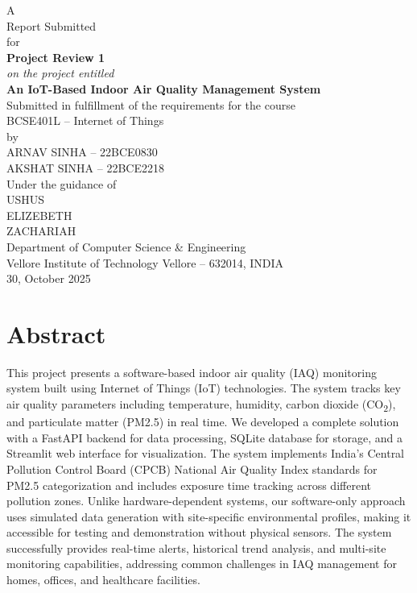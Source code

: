 \documentclass[12pt]{report}
\newcommand{\course}{BCSE401L -- Internet of Things}
\newcommand{\projecttitle}{An IoT-Based Indoor Air Quality Management System}
\newcommand{\institute}{Vellore Institute of Technology Vellore -- 632014, INDIA}
\newcommand{\dept}{Department of Computer Science \& Engineering}
\newcommand{\authors}{ARNAV SINHA -- 22BCE0830\\AKSHAT SINHA -- 22BCE2218}
\newcommand{\guides}{USHUS\\ELIZEBETH\\ZACHARIAH}
\newcommand{\reportdate}{30, October 2025}
\begin{document}
\begin{titlepage}
\centering
\vspace*{1cm}
{\large A\\[6pt] Report Submitted\\[6pt] for}\\[12pt]
{\bfseries\Large Project Review 1}\\[10pt]
{\itshape on the project entitled}\\[4pt]
{\bfseries\LARGE \projecttitle}\\[8pt]
{\large Submitted in fulfillment of the requirements for the course}\\[4pt]
{\Large \course}\\[12pt]
{by}\\[6pt]
{\large \authors}\\[12pt]
{Under the guidance of}\\[6pt]
{\large \guides}\\[12pt]
\vfill
{}
{\dept}\\[4pt]
{\institute}\\[6pt]
{\reportdate}
\end{titlepage}

\tableofcontents
\cleardoublepage
{}

\section*{Abstract}
This project presents a software-based indoor air quality (IAQ) monitoring system built using Internet of Things (IoT) technologies. The system tracks key air quality parameters including temperature, humidity, carbon dioxide (CO\textsubscript{2}), and particulate matter (PM2.5) in real time. We developed a complete solution with a FastAPI backend for data processing, SQLite database for storage, and a Streamlit web interface for visualization. The system implements India's Central Pollution Control Board (CPCB) National Air Quality Index standards for PM2.5 categorization and includes exposure time tracking across different pollution zones. Unlike hardware-dependent systems, our software-only approach uses simulated data generation with site-specific environmental profiles, making it accessible for testing and demonstration without physical sensors. The system successfully provides real-time alerts, historical trend analysis, and multi-site monitoring capabilities, addressing common challenges in IAQ management for homes, offices, and healthcare facilities.
\end{document}
